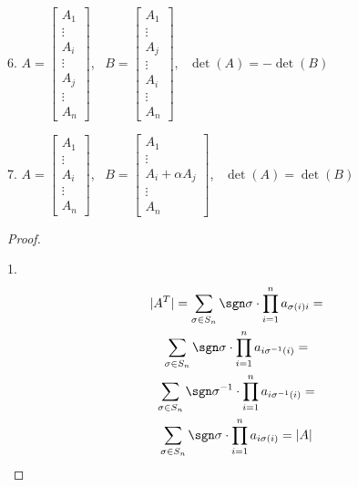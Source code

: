 \begin{prop}
    6. $A = \begin{bmatrix}
        A_1 \\
        \vdots \\
        A_i \\
        \vdots \\
        A_j \\
        \vdots \\
        A_n
    \end{bmatrix}$,~ $B = \begin{bmatrix}
        A_1 \\
        \vdots \\
        A_j \\
        \vdots \\
        A_i \\
        \vdots \\
        A_n
    \end{bmatrix}$,~ $\det(A) = -\det(B)$

    7. $A = \begin{bmatrix}
        A_1 \\
        \vdots \\
        A_i \\
        \vdots \\
        A_n
    \end{bmatrix}$,~ $B = \begin{bmatrix}
        A_1 \\
        \vdots \\
        A_i + \alpha A_j \\
        \vdots \\
        A_n
    \end{bmatrix}$,~ $\det(A) = \det(B)$
\end{prop}

\begin{proof}~

    1. \begin{gather*}
        |A^T| = \sum\limits_{\sigma \in S_n} \sgn \sigma \cdot \prod\limits_{i = 1}^n a_{\sigma(i)i} = \\
        \sum\limits_{\sigma \in S_n} \sgn \sigma \cdot \prod\limits_{i = 1}^n a_{i\sigma^{-1}(i)} = \\
        \sum\limits_{\sigma \in S_n} \sgn \sigma^{-1} \cdot \prod\limits_{i = 1}^n a_{i\sigma^{-1}(i)} = \\
        \sum\limits_{\sigma \in S_n} \sgn \sigma \cdot \prod\limits_{i = 1}^n a_{i\sigma(i)} = |A|
    \end{gather*}

    \TODO[Дописать]
\end{proof}

